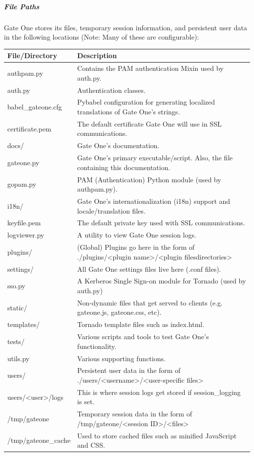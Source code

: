 \documentclass[letterpaper,10pt,openany]{sphinxmanual}
\begin{document}
\subparagraph{File Paths}
\label{Developer/server:file-paths}
Gate One stores its files, temporary session information, and persistent user
data in the following locations (Note: Many of these are configurable):

\begin{tabulary}{\linewidth}{|L|L|}
\hline
\textsf{\relax 
File/Directory
} & \textsf{\relax 
Description
}\\
\hline
authpam.py
 & 
Contains the PAM authentication Mixin used by auth.py.
\\
\hline
auth.py
 & 
Authentication classes.
\\
\hline
babel\_gateone.cfg
 & 
Pybabel configuration for generating localized translations of Gate One's strings.
\\
\hline
certificate.pem
 & 
The default certificate Gate One will use in SSL communications.
\\
\hline
docs/
 & 
Gate One's documentation.
\\
\hline
gateone.py
 & 
Gate One's primary executable/script. Also, the file containing this documentation.
\\
\hline
gopam.py
 & 
PAM (Authentication) Python module (used by authpam.py).
\\
\hline
i18n/
 & 
Gate One's internationalization (i18n) support and locale/translation files.
\\
\hline
keyfile.pem
 & 
The default private key used with SSL communications.
\\
\hline
logviewer.py
 & 
A utility to view Gate One session logs.
\\
\hline
plugins/
 & 
(Global) Plugins go here in the form of ./plugins/\textless{}plugin name\textgreater{}/\textless{}plugin files\textbar{}directories\textgreater{}
\\
\hline
settings/
 & 
All Gate One settings files live here (.conf files).
\\
\hline
sso.py
 & 
A Kerberos Single Sign-on module for Tornado (used by auth.py)
\\
\hline
static/
 & 
Non-dynamic files that get served to clients (e.g. gateone.js, gateone.css, etc).
\\
\hline
templates/
 & 
Tornado template files such as index.html.
\\
\hline
tests/
 & 
Various scripts and tools to test Gate One's functionality.
\\
\hline
utils.py
 & 
Various supporting functions.
\\
\hline
users/
 & 
Persistent user data in the form of ./users/\textless{}username\textgreater{}/\textless{}user-specific files\textgreater{}
\\
\hline
users/\textless{}user\textgreater{}/logs
 & 
This is where session logs get stored if session\_logging is set.
\\
\hline
/tmp/gateone
 & 
Temporary session data in the form of /tmp/gateone/\textless{}session ID\textgreater{}/\textless{}files\textgreater{}
\\
\hline
/tmp/gateone\_cache
 & 
Used to store cached files such as minified JavaScript and CSS.
\\
\hline\end{tabulary}
\end{document}
